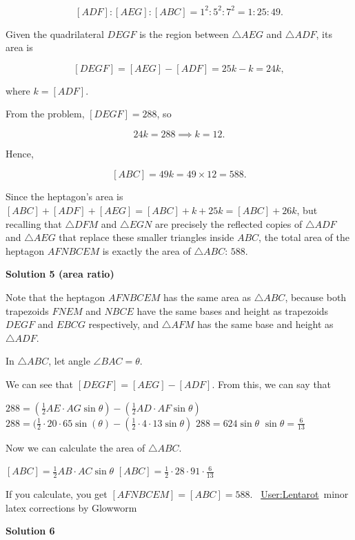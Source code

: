 \begin{enumerate}
 
 \[[ADF] : [AEG] : [ABC] = 1^2 : 5^2 : 7^2 = 1:25:49.\]

 Given the quadrilateral \( DEGF \) is the region between \( \triangle AEG \) and \( \triangle ADF \), its area is

 
 \[[DEGF] = [AEG] - [ADF] = 25k - k = 24k,\]

 where \( k = [ADF] \).

 From the problem, \( [DEGF] = 288 \), so

 
 \[24k = 288 \implies k = 12.\]

 Hence,

 
 \[[ABC] = 49k = 49 \times 12 = 588.\]

 Since the heptagon's area is \( [ABC] + [ADF] + [AEG] = [ABC] + k + 25k = [ABC] + 26k \), but recalling that \( \triangle DFM \) and \( \triangle EGN \) are precisely the reflected copies of \( \triangle ADF \) and \( \triangle AEG \) that replace these smaller triangles inside \( ABC \), the total area of the heptagon \( AFNBCEM \) is exactly the area of \( \triangle ABC \): \(\boxed{588}\).

 



\textbf{Solution 5 (area ratio)}

Note that the heptagon $AFNBCEM$ has the same area as $\triangle ABC$, because both trapezoids $FNEM$ and $NBCE$ have the same bases and height as trapezoids $DEGF$ and $EBCG$ respectively, and $\triangle AFM$ has the same base and height as $\triangle ADF$.

 In $\triangle ABC$, let angle $\angle BAC=\theta$.

 We can see that $[DEGF]=[AEG]-[ADF]$. From this, we can say that

 $288=(\frac{1}{2}AE\cdot AG \sin\theta)-(\frac{1}{2}AD\cdot AF \sin\theta)$
$288=(\frac{1}{2}\cdot 20\cdot 65 \sin(\theta)-(\frac{1}{2}\cdot 4\cdot 13 \sin\theta)$
$288=624\sin\theta$
$\sin\theta = \frac{6}{13}$

 Now we can calculate the area of $\triangle ABC$.

 $[ABC]=\frac{1}{2}AB\cdot AC\sin\theta$
$[ABC]=\frac{1}{2}\cdot 28\cdot 91\cdot \frac{6}{13}$

 If you calculate, you get $[AFNBCEM]=[ABC]=\boxed{588}$. ~\href{https://artofproblemsolving.com/wiki/index.php?title=User:Lentarot}{User:Lentarot}~minor latex corrections by Glowworm

 



\textbf{Solution 6}


\end{enumerate}
